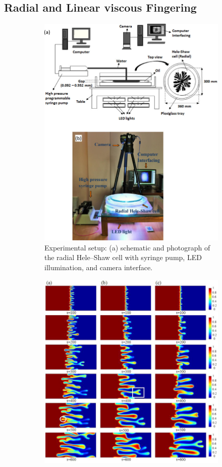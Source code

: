 \documentclass[12pt,a4paper]{article}
\begin{document}
\subsection{Radial and Linear viscous Fingering}
\begin{figure}[H]
  \centering

  \begin{subfigure}{0.45\linewidth}
    \includegraphics[width=0.8\linewidth]{aparatus-002.jpg}
    \caption{Experimental setup: (a) schematic and photograph of the radial Hele–Shaw cell with syringe pump, LED illumination, and camera interface.}
  \end{subfigure}
  \hfill
  \begin{subfigure}{0.45\linewidth}
    \includegraphics[width=0.9\linewidth]{1-s2.0-S0020740317306422-linaer.jpg}

\end{subfigure}
\end{figure}
\end{document}
